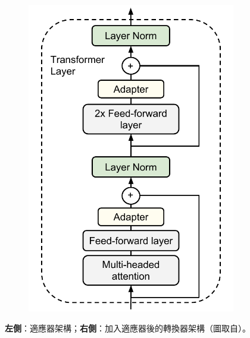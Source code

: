 \begin{figure}[htbp]
\begin{subfigure}[t]{0.5\textwidth}
        \includegraphics[width=\textwidth]{figs/chapter3/adapters/adapter_insertion.pdf}
    \end{subfigure}
    \caption{\textbf{左側}：適應器架構；\textbf{右側}：加入適應器後的轉換器架構（圖取自\cite{rebuffi2018efficient}）。}
    \label{fig:adapter}
\end{figure}